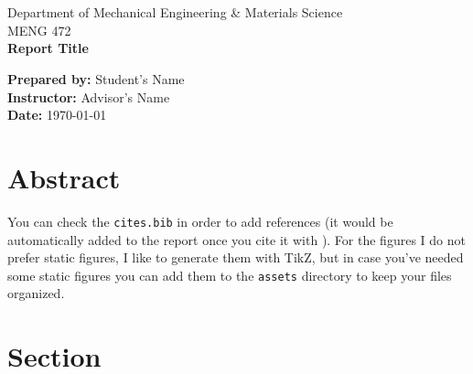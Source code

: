 \documentclass[12pt]{article}
\def \LOGOPATH {assets/SEAS-logo.svg}
\def \DEPARTEMENT {Department of Mechanical Engineering \& Materials Science}
\def \COURSENUM {MENG 472}
\def \REPORTTITLE {Report Title}
\def \STUDENTNAME {Student's Name}
\def \INSTRUCTOR {Advisor's Name}
\begin{document}

\begin{titlepage}
    \vfill
    \begin{center}
         \\
        \hfill \\
        \Large{\DEPARTEMENT} \\
        \Large{\COURSENUM\;} \\
        \vfill
        \textbf{\LARGE{\REPORTTITLE}}
    \end{center}
    \vfill
    \begin{flushleft}
        \Large{\textbf{Prepared by:} \STUDENTNAME} \\
        \Large{\textbf{Instructor:} \INSTRUCTOR} \\
        \Large{\textbf{Date:} \today}
    \end{flushleft}
    \vfill
\end{titlepage}

{
\centering
\section*{Abstract}
You can check the \texttt{cites.bib} in order to add references (it would be automatically added to the report once you cite it \cite{rfc3447} with \texttt{\cite{tag}}). For the figures I do not prefer static figures, I like to generate them with TikZ, but in case you've needed some static figures you can add them to the \texttt{assets} directory to keep your files organized.
\clearpage
}


\tableofcontents
\clearpage

\setlength{\parskip}{\baselineskip}%



\section{Section}
\end{document}
